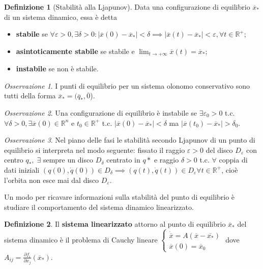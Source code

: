 \documentclass{book}
\theoremstyle{plain}
\theoremstyle{plain}
\theoremstyle{plain}
\theoremstyle{plain}
\theoremstyle{plain}
\theoremstyle{definition}
\newtheorem{defi}{Definizione}[chapter]
\theoremstyle{remark}
\newtheorem*{oss}{Osservazione}
\theoremstyle{definition}
\begin{document}
\begin{defi}[Stabilità alla Ljapunov]
\everymath{\displaystyle}
    Data una configurazione di equilibrio $\overline{x}_*$ di un sistema dinamico, essa è detta
    \begin{itemize}
        \item \textbf{stabile} se $\forall \varepsilon>0, \exists\delta>0 : |\overline{x}(0)-\overline{x}_*|<\delta \implies |\overline{x}(t)-\overline{x}_*|<\varepsilon, \forall t\in \mathbb{R}^+$;
        \item \textbf{asintoticamente stabile} se stabile e $\lim_{t\to +\infty} \overline{x}(t)=\overline{x}_*$;
        \item \textbf{instabile} se non è stabile.
    \end{itemize}
\end{defi}

\begin{oss}
    I punti di equilibrio per un sistema olonomo conservativo sono tutti della forma $\overline{x}_*=(\overline{q}_*, \overline{0}$).
\end{oss}

\begin{oss}
    Una configurazione di equilibrio è instabile se $\exists \varepsilon_0>0$ t.c. $\forall\delta>0, \exists\overline{x}(0) \in \mathbb{R}^n$ e $t_0 \in \mathbb{R}^+$ t.c. $|\overline{x}(0)-\overline{x}_*|<\delta$ ma $|\overline{x}(t_0)-\overline{x}_*|>\delta_0$.
\end{oss}

\begin{oss}
    Nel piano delle fasi le stabilità secondo Ljapunov di un punto di equilibrio si interpreta nel modo seguente: fissato il raggio $\varepsilon>0$ del disco $D_{\varepsilon}$ con centro $q_*, \;\exists$ sempre un disco $D_{\delta}$ centrato in $q*$ e raggio $\delta>0$ t.c. $\forall$ coppia di dati iniziali $(q(0),\dot{q}(0))\in D_{\delta} \implies (q(t),\dot{q}(t))\in D_{\varepsilon} \forall t \in \mathbb{R}^+$, cioè l'orbita non esce mai dal disco $D_{\varepsilon}$.
\end{oss}

\noindent Un modo per ricavare informazioni sulla stabilità del punto di equilibrio è studiare il comportamento del sistema dinamico linearizzato.

\begin{defi}
    Il \textbf{sistema linearizzato} attorno al punto di equilibrio $\overline{x}_*$ del sistema dinamico è il problema di Cauchy lineare
    $\begin{cases}
        \dot{\overline{x}}=A(\overline{x}-{\overline{x_*}}) \\
        \overline{x}(0)=\overline{x}_0    
    \end{cases}$
    dove $A_{ij}=\frac{\partial f_i}{\partial x_j}(\overline{x}_*)$.
\end{defi}
\end{document}
